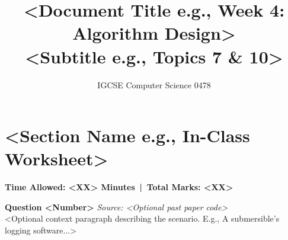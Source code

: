 




\title{\bfseries <Document Title e.g., Week 4: Algorithm Design>\\ \large <Subtitle e.g., Topics 7 \& 10>}
\author{IGCSE Computer Science 0478}
\date{}
\maketitle

\section*{<Section Name e.g., In-Class Worksheet>}

\textbf{Time Allowed: <XX> Minutes \,|\, Total Marks: <XX>}

\vspace{1em}

\noindent\textbf{Question <Number>} \hfill \textit{Source: <Optional past paper code>}
\\
<Optional context paragraph describing the scenario. E.g., A submersible's logging software...>

